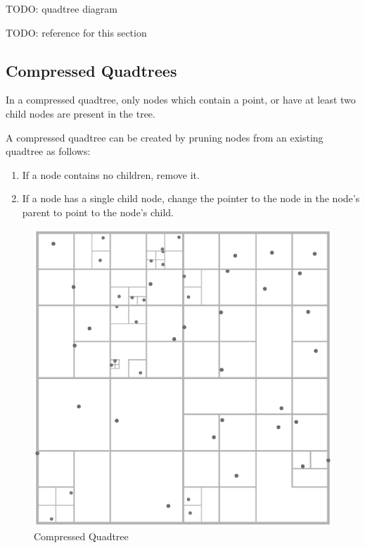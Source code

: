 \documentclass[mcs]{scsthesis}
\begin{document}
TODO: quadtree diagram

TODO: reference for this section

\subsection{Compressed Quadtrees}

In a compressed quadtree, only nodes which contain a point, or have at least
two child nodes are present in the tree.

A compressed quadtree can be created by pruning nodes from an existing quadtree
as follows:

\begin{enumerate}
\item If a node contains no children, remove it.
\item If a node has a single child node, change the pointer to the node in the
node's parent to point to the node's child.
\end{enumerate}

\begin{figure}
\begin{center}
\includegraphics[scale=0.4]{diagrams/compressed_quadtree.eps}
\caption{Compressed Quadtree}
\end{center}
\end{figure}
\end{document}
